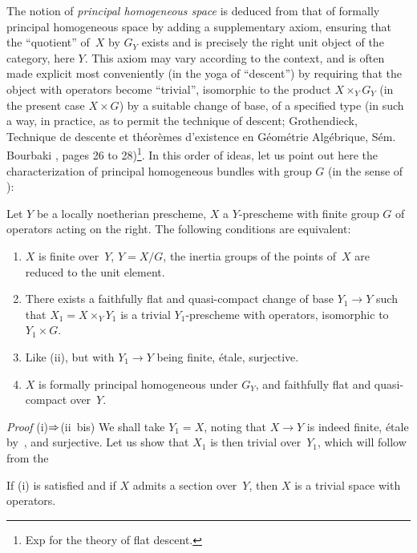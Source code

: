 The
notion of \emph{principal homogeneous space}
is deduced from that of formally principal
homogeneous space by adding a supplementary axiom, ensuring that the
``quotient'' of~$X$ by $G_Y$ exists and is precisely
the right unit object of the category, here $Y$. This
axiom may vary according to the context, and is often made explicit most
conveniently (in the yoga of ``descent'') by requiring that
the object with operators become ``trivial'', \ie isomorphic to the
product $X \times_Y G_Y$ (in the present case $X \times G$) by a
suitable change of base, of a specified type (in such a way, in practice, as to permit the technique of descent;
\cf Grothendieck, Technique de descente et th\'eor\`emes
d'existence en G\'eom\'etrie Alg\'ebrique, S\'em. Bourbaki
, pages 26 to 28)\footnote{\Cf Exp\ptbl {} for the
theory of flat descent.}. In this order of ideas,
let us point out here the characterization of principal
homogeneous bundles with group $G$ (in the sense of \loccit):

\begin{proposition}
\label{V.2.6}
Let $Y$ be a locally noetherian prescheme, $X$ a
$Y$-prescheme with finite group $G$ of operators
acting on the right. The following conditions are
equivalent:
\begin{enumerate}
\item[(i)] $X$ is finite over~$Y$, $Y=X/G$, the inertia groups of the
points of~$X$ are reduced to the unit element.
\item[(ii)] There exists a faithfully flat and
quasi-compact change of base $Y_1 \to Y$ such that $X_1=X \times_Y Y_1$ is a
trivial $Y_1$-prescheme with operators, \ie isomorphic
to $Y_1 \times G$.
\item[(ii~bis)] Like (ii), but with $Y_1 \to Y$ being finite,
\'etale, surjective.
\item[(iii)] $X$ is formally principal homogeneous under $G_Y$,
and faithfully flat and quasi-compact over~$Y$.
\end{enumerate}
\end{proposition}
\textit{Proof} (i)$\To$(ii~bis) We shall take
$Y_1=X$, noting that $X \to Y$ is indeed finite, \'etale by~,
and surjective. Let us show that $X_1$ is then trivial over~$Y_1$, which
will follow from the

\begin{corollary}
\label{V.2.7} If \textup{(i)} is satisfied and if $X$ admits a
section over~$Y$, then $X$ is a trivial space with operators.
\end{corollary}

